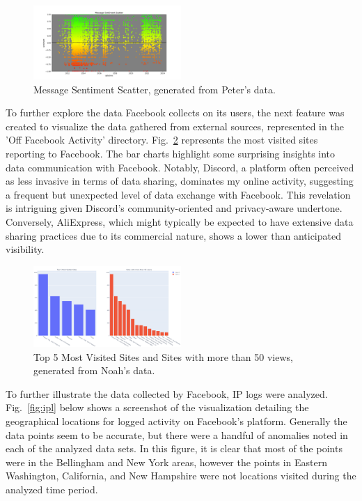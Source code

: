 \documentclass[conference, letterpaper, 11pt]{IEEEtran}
\begin{document}
\begin{figure}[htbp]
    \centering
    \includegraphics[width=0.5\textwidth]{img/mss.png}
    \caption{Message Sentiment Scatter, generated from Peter's data.}
    \label{fig:ssp}
\end{figure}

To further explore the data Facebook collects on its users, the next feature was created to visualize the data gathered from external sources, represented in the 'Off Facebook Activity' directory. Fig.~\ref{fig:ofa} represents the most visited sites reporting to Facebook. The bar charts highlight some surprising insights into data communication with Facebook. Notably, Discord, a platform often perceived as less invasive in terms of data sharing, dominates my online activity, suggesting a frequent but unexpected level of data exchange with Facebook. This revelation is intriguing given Discord's community-oriented and privacy-aware undertone. Conversely, AliExpress, which might typically be expected to have extensive data sharing practices due to its commercial nature, shows a lower than anticipated visibility.

\begin{figure}[htbp]
    \centering
    \includegraphics[width=0.5\textwidth]{img/ofa.png}
    \caption{Top 5 Most Visited Sites and Sites with more than 50 views, generated from Noah’s data.}
    \label{fig:ofa}
\end{figure}

To further illustrate the data collected by Facebook, IP logs were analyzed. Fig.~\ref{fig:ipl} below shows a screenshot of the visualization detailing the geographical locations for logged activity on Facebook's platform. Generally the data points seem to be accurate, but there were a handful of anomalies noted in each of the analyzed data sets. In this figure, it is clear that most of the points were in the Bellingham and New York areas, however the points in Eastern Washington, California, and New Hampshire were not locations visited during the analyzed time period.
\end{document}
